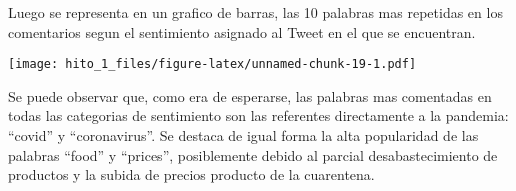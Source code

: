 \documentclass[
]{article}
\newenvironment{Shaded}{\begin{snugshade}}{\end{snugshade}}
\newcommand{\CommentTok}[1]{\textcolor[rgb]{0.56,0.35,0.01}{\textit{#1}}}
\newcommand{\DataTypeTok}[1]{\textcolor[rgb]{0.13,0.29,0.53}{#1}}
\newcommand{\DecValTok}[1]{\textcolor[rgb]{0.00,0.00,0.81}{#1}}
\newcommand{\KeywordTok}[1]{\textcolor[rgb]{0.13,0.29,0.53}{\textbf{#1}}}
\newcommand{\NormalTok}[1]{#1}
\newcommand{\OperatorTok}[1]{\textcolor[rgb]{0.81,0.36,0.00}{\textbf{#1}}}
\newcommand{\StringTok}[1]{\textcolor[rgb]{0.31,0.60,0.02}{#1}}
\begin{document}
\begin{Shaded}
\end{Shaded}

Luego se representa en un grafico de barras, las 10 palabras mas
repetidas en los comentarios segun el sentimiento asignado al Tweet en
el que se encuentran.

\begin{Shaded}
\end{Shaded}

\texttt{[image: hito\_1\_files/figure-latex/unnamed-chunk-19-1.pdf]}

Se puede observar que, como era de esperarse, las palabras mas
comentadas en todas las categorias de sentimiento son las referentes
directamente a la pandemia: ``covid'' y ``coronavirus''. Se destaca de
igual forma la alta popularidad de las palabras ``food'' y ``prices'',
posiblemente debido al parcial desabastecimiento de productos y la
subida de precios producto de la cuarentena.
\end{document}

